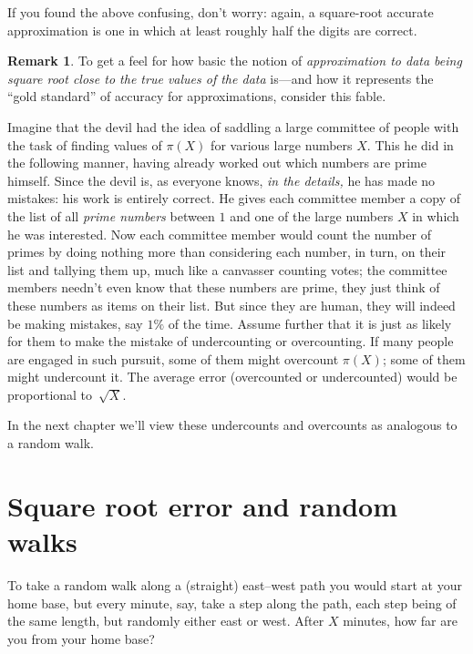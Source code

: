 \documentclass[openany]{book}
\theoremstyle{plain}
\theoremstyle{definition}
\newtheorem{remark}[theorem]{Remark}
\begin{document}
If you found the above confusing, don't worry: again, a
square-root accurate approximation is one in which at least roughly
half the digits are correct.


\begin{remark}
  To get a feel for how basic the notion of {\em approximation to data
    being square root close to the true values of the data} is---and
  how it represents the ``gold standard'' of accuracy for
  approximations, consider this fable.

  Imagine that the devil had the idea of saddling a large committee of
  people with the task of finding values of $\pi(X)$ for various large
  numbers $X$.  This he did in the following manner, having already
  worked out which numbers are prime himself. Since the devil is, as
  everyone knows, {\em in the details,} he has made no mistakes: his
  work is entirely correct.  He gives each committee member a copy of
  the list of all {\em prime numbers} between $1$ and one of the large
  numbers $X$ in which he was interested.  Now each committee member
  would count the number of primes by doing nothing more than
  considering each number, in turn, on their list and tallying them
  up, much like a canvasser counting votes; the committee members  needn't even know that these numbers are prime, they just think of these numbers as items on their list. But since they are human,
  they will indeed be making mistakes, say $1\%$ of the time.
  Assume further that it is just as likely for them to make the
  mistake of undercounting or overcounting.  If many people are
  engaged in such pursuit, some of them might overcount $\pi(X)$;
  some of them might undercount it. The average error (overcounted
  or undercounted) would be proportional to~${\sqrt X}$.

  In the next chapter we'll view these undercounts and overcounts as analogous to a random walk.


\end{remark}


\chapter{Square root error and random walks}

 To take a random walk along a (straight) east--west path  you would start at your home base, but every minute, say, take a step along the path, each step being of the same length, but randomly either east or west. After $X$ minutes, how far are you from your home base?
\end{document}
